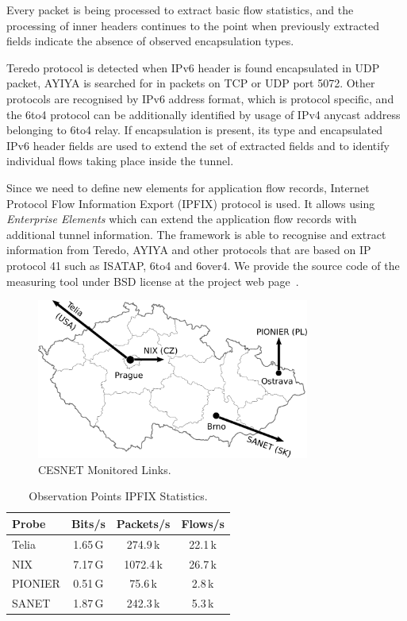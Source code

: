 Every packet is being processed to extract basic flow statistics, and the processing of inner headers continues to the point when previously extracted fields indicate the absence of observed encapsulation types.

Teredo protocol is detected when IPv6 header is found encapsulated in UDP packet, AYIYA is searched for in packets on TCP or UDP port 5072. Other protocols are recognised by IPv6 address format, which is protocol specific, and the 6to4 protocol can be additionally identified by usage of IPv4 anycast address belonging to 6to4 relay. If encapsulation is present, its type and encapsulated IPv6 header fields are used to extend the set of extracted fields and to identify individual flows taking place inside the tunnel. 

Since we need to define new elements for application flow records, Internet Protocol Flow Information Export (IPFIX) protocol is used. It allows using \emph{Enterprise Elements} which can extend the application flow records with additional tunnel information. 
The framework is able to recognise and extract information from Teredo, AYIYA and other protocols that are based on IP protocol 41 such as ISATAP, 6to4 and 6over4. 
We provide the source code of the measuring tool under BSD license at the project web page~\cite{Elich-2013-FlowMon}.

\begin{figure}[!tb]
\centering
\includegraphics[width=0.8\textwidth]{figures/paper-tunnels/cesnet-map}
\caption{CESNET Monitored Links.}
\label{fig:ipv6-tunnels-topology}
\end{figure}

\begin{table}[!tb]
\centering
        \begin{tabular}{lccc}
        \textbf{Probe} & \textbf{Bits/s} & \textbf{Packets/s} & \textbf{Flows/s} \\ \toprule 
        Telia & 1.65\,G & 274.9\,k & 22.1\,k \\
        NIX & 7.17\,G & 1072.4\,k & 26.7\,k \\
        PIONIER & 0.51\,G & 75.6\,k & 2.8\,k \\
        SANET & 1.87\,G & 242.3\,k & 5.3\,k \\ \bottomrule
        \end{tabular}
        \caption{Observation Points IPFIX Statistics.}
        \label{tab:ipv6-tunnels-collected-data}
\end{table}

